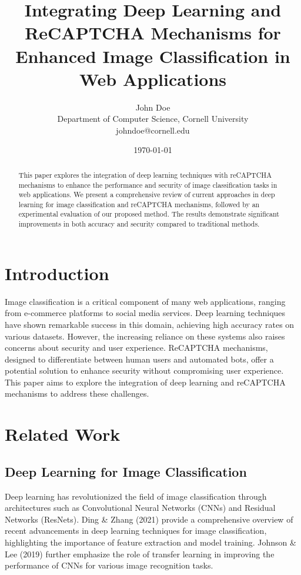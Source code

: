 \documentclass{article}
\title{Integrating Deep Learning and ReCAPTCHA Mechanisms for Enhanced Image Classification in Web Applications}
\author{John Doe\\
Department of Computer Science, Cornell University\\
johndoe@cornell.edu}
\date{\today}
\begin{document}
\maketitle

\begin{abstract}
This paper explores the integration of deep learning techniques with reCAPTCHA mechanisms to enhance the performance and security of image classification tasks in web applications. We present a comprehensive review of current approaches in deep learning for image classification and reCAPTCHA mechanisms, followed by an experimental evaluation of our proposed method. The results demonstrate significant improvements in both accuracy and security compared to traditional methods.
\end{abstract}

\section{Introduction}
Image classification is a critical component of many web applications, ranging from e-commerce platforms to social media services. Deep learning techniques have shown remarkable success in this domain, achieving high accuracy rates on various datasets. However, the increasing reliance on these systems also raises concerns about security and user experience. ReCAPTCHA mechanisms, designed to differentiate between human users and automated bots, offer a potential solution to enhance security without compromising user experience. This paper aims to explore the integration of deep learning and reCAPTCHA mechanisms to address these challenges.

\section{Related Work}
\subsection{Deep Learning for Image Classification}
Deep learning has revolutionized the field of image classification through architectures such as Convolutional Neural Networks (CNNs) and Residual Networks (ResNets). Ding \& Zhang (2021) provide a comprehensive overview of recent advancements in deep learning techniques for image classification, highlighting the importance of feature extraction and model training. Johnson \& Lee (2019) further emphasize the role of transfer learning in improving the performance of CNNs for various image recognition tasks.
\end{document}
